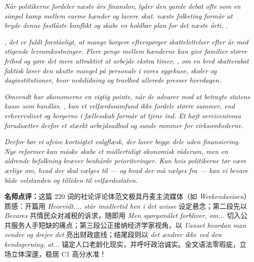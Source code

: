 \begin{answerbox}
\textit{Når politikerne fordeler næste års finanslov, lyder den gamle debat ofte som en simpel kamp mellem varme hænder og lavere skat.  næste folketing formår at bryde denne fastlåste konflikt og skabe en holdbar plan for det næste årti, .}

\textit{, det er fuldt forståeligt, at mange borgere efterspørger skattelettelser efter år med stigende leveomkostninger. Flere penge mellem hænderne kan give familier større frihed og gøre det mere attraktivt at arbejde ekstra timer. , om en bred skatterabat faktisk løser den akutte mangel på personale i vores sygehuse, skoler og daginstitutioner, hvor nedslidning og travlhed allerede presser hverdagen.}

\textit{Omvendt har økonomerne en vigtig pointe, når de advarer mod at betragte statens kasse som bundløs. , kan et velfærdssamfund ikke fordele større summer, end erhvervslivet og borgerne i fællesskab formår at tjene ind. Et højt serviceniveau forudsætter derfor et stærkt arbejdsudbud og sunde rammer for virksomhederne.}

\textit{Derfor bør vi afvise kortsigtet valgflæsk, der lover begge dele uden finansiering. Nye reformer kan måske skabe et midlertidigt økonomisk råderum, men  en aldrende befolkning kræver benhårde prioriteringer. Kun hvis politikerne tør være ærlige om, hvad der skal vælges til --- og hvad der må vælges fra --- kan vi bevare både velstanden og tilliden til velfærdsstaten.}

\small\textbf{名师点评：}这篇 220 词的社论评论体范文极具丹麦主流媒体（如 \textit{Weekendavisen}）质感：开篇用 \textit{Hvorvidt..., står imidlertid hen i det uvisse} 设定悬念；第二段先以 \textit{Bevares} 共情民众对减税的诉求，随即用 \textit{Men spørgsmålet forbliver, om...} 切入公共服务人手短缺的痛点；第三段公正接纳经济学家视角，以 \textit{Uanset hvordan man vender og drejer det} 亮出财政底线；结尾段则以 \textit{det ændrer ikke ved den kendsgerning, at...} 锚定人口老龄化现实，并呼吁政治诚实。全文语法零瑕疵，立场立体深邃，稳居 C1 高分水准！
\end{answerbox}
